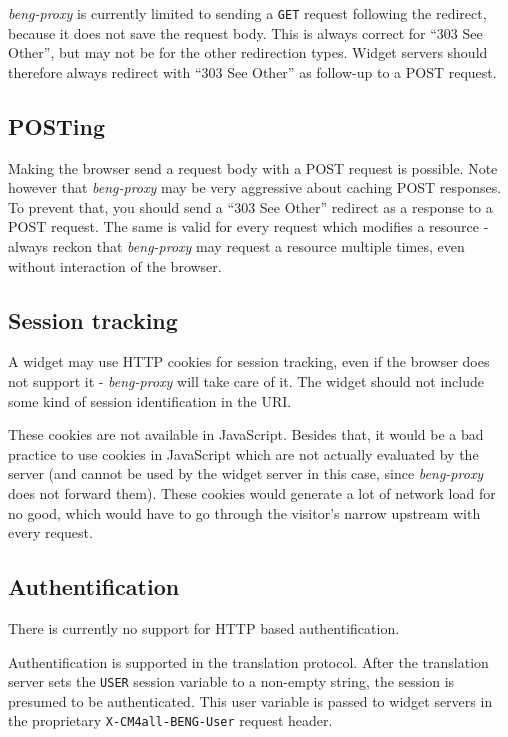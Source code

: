 \documentclass[a4paper,12pt]{article}
\begin{document}
\emph{beng-proxy} is currently limited to sending a \texttt{GET}
request following the redirect, because it does not save the request
body.  This is always correct for ``303 See Other'', but may not be
for the other redirection types.  Widget servers should therefore
always redirect with ``303 See Other'' as follow-up to a POST request.

\subsection{POSTing}

Making the browser send a request body with a POST request is
possible.  Note however that \emph{beng-proxy} may be very aggressive
about caching POST responses.  To prevent that, you should send a
``303 See Other'' redirect as a response to a POST request.  The same
is valid for every request which modifies a resource - always reckon
that \emph{beng-proxy} may request a resource multiple times, even
without interaction of the browser.

\subsection{Session tracking}

A widget may use HTTP cookies for session tracking, even if the
browser does not support it - \emph{beng-proxy} will take care of it.
The widget should not include some kind of session identification in
the URI.

These cookies are not available in JavaScript.  Besides that, it would
be a bad practice to use cookies in JavaScript which are not actually
evaluated by the server (and cannot be used by the widget server in
this case, since \emph{beng-proxy} does not forward them).  These
cookies would generate a lot of network load for no good, which would
have to go through the visitor's narrow upstream with every request.

\subsection{Authentification}

There is currently no support for HTTP based authentification.

Authentification is supported in the translation protocol.  After the
translation server sets the \texttt{USER} session variable to a
non-empty string, the session is presumed to be authenticated.  This
user variable is passed to widget servers in the proprietary
\texttt{X-CM4all-BENG-User} request header.
\end{document}
